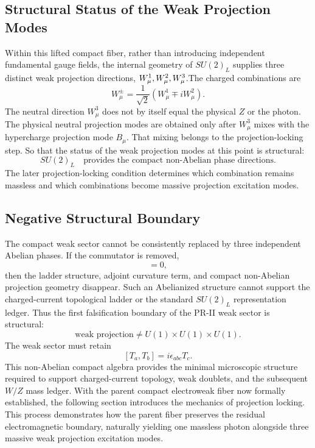 \documentclass[11pt]{article}
\begin{document}
\subsection{Structural Status of the Weak Projection Modes}
\label{sec:pr2_weak_projection_modes_status}
Within this lifted compact fiber, rather than introducing independent fundamental gauge fields, the internal geometry of $SU(2)_L$ supplies three distinct weak projection directions, $W_\mu^1, \space \space W_\mu^2, \space \space W_\mu^3$.The charged combinations are
\begin{equation}
\boxed{
W_\mu^\pm
=
\frac{1}{\sqrt2}
\left(
W_\mu^1
\mp
iW_\mu^2
\right).
}
\end{equation}
The neutral direction \(W_\mu^3\) does not by itself equal the physical \(Z\) or the photon. 
The physical neutral projection modes are obtained only after \(W_\mu^3\) mixes with the hypercharge projection mode \(B_\mu\). 
That mixing belongs to the projection-locking step. So that the status of the weak projection modes at this point is structural:
\begin{equation}
\boxed{
SU(2)_L
\quad
\text{provides the compact non-Abelian phase directions.}
}
\end{equation}
The later projection-locking condition determines which combination remains massless and which combinations become massive projection excitation modes.

\subsection{Negative Structural Boundary}
\label{sec:pr2_negative_structural_boundary}

The compact weak sector cannot be consistently replaced by three independent Abelian phases. 
If the commutator is removed,
\begin{equation}
[T_a,T_b]=0,
\end{equation}
then the ladder structure, adjoint curvature term, and compact non-Abelian projection geometry disappear. 
Such an Abelianized structure cannot support the charged-current topological ladder or the standard \(SU(2)_L\) representation ledger. Thus the first falsification boundary of the PR-II weak sector is structural:
\begin{equation}
\boxed{
\text{weak projection}
\neq
U(1)\times U(1)\times U(1).
}
\end{equation}
The weak sector must retain
\begin{equation}
\boxed{
[T_a,T_b]
=
i\epsilon_{abc}T_c.
}
\end{equation}
This non-Abelian compact algebra provides the minimal microscopic structure required to support charged-current topology, weak doublets, and the subsequent $W/Z$ mass ledger. With the parent compact electroweak fiber now formally established, the following section introduces the mechanics of projection locking. This process demonstrates how the parent fiber preserves the residual electromagnetic boundary, naturally yielding one massless photon alongside three massive weak projection excitation modes.
\end{document}
